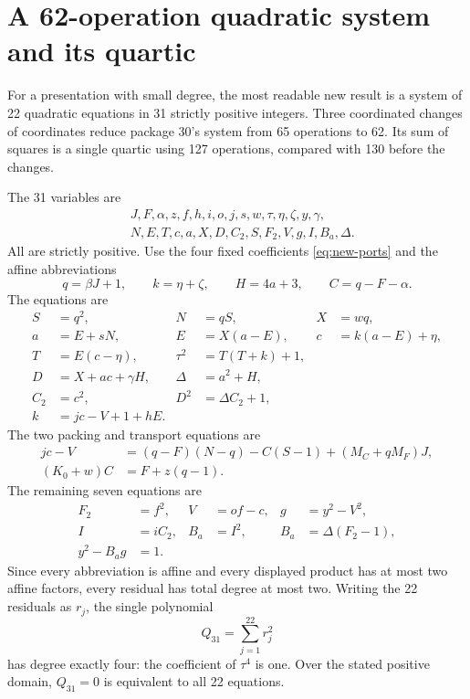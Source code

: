 \section{A 62-operation quadratic system and its quartic}
\label{sec:quartic}

For a presentation with small degree, the most readable new result is
a system of 22 quadratic equations in 31 strictly positive integers.
Three coordinated changes of coordinates reduce package 30's system
from 65 operations to 62. Its sum of squares is a single quartic using
127 operations, compared with 130 before the changes.

The 31 variables are
\begin{align*}
 &J,F,\alpha,z,f,h,i,o,j,s,w,\tau,\eta,\zeta,y,\gamma,\\
 &N,E,T,c,a,X,D,C_2,S,F_2,V,g,I,B_a,\Delta.
\end{align*}
All are strictly positive. Use the four fixed coefficients
\eqref{eq:new-ports} and the affine abbreviations
\[
 q=\beta J+1,\qquad k=\eta+\zeta,\qquad H=4a+3,
 \qquad C=q-F-\alpha.
\]
The equations are
\begin{align}
 S&=q^2, &N&=qS, &X&=wq,\label{eq:quad-start}\\
 a&=E+sN, &E&=X(a-E), &c&=k(a-E)+\eta,\\
 T&=E(c-\eta), &\tau^2&=T(T+k)+1,\\
 D&=X+ac+\gamma H, &\Delta&=a^2+H,\\
 C_2&=c^2, &D^2&=\Delta C_2+1,\\
 k&=jc-V+1+hE.&&
\end{align}
The two packing and transport equations are
\begin{align}
 jc-V&=(q-F)(N-q)-C(S-1)+(M_C+qM_F)J,\\
 (K_0+w)C&=F+z(q-1).
\end{align}
The remaining seven equations are
\begin{align}
 F_2&=f^2, &V&=of-c, &g&=y^2-V^2,\\
 I&=iC_2, &B_a&=I^2, &B_a&=\Delta(F_2-1),\\
 y^2-B_ag&=1.&&&\label{eq:quad-end}
\end{align}
Since every abbreviation is affine and every displayed product has
at most two affine factors, every residual has total degree at most two.
Writing the 22 residuals as $r_j$, the single polynomial
\begin{equation}\label{eq:new-quartic}
 Q_{31}=\sum_{j=1}^{22}r_j^2
\end{equation}
has degree exactly four: the coefficient of $\tau^4$ is one. Over the
stated positive domain, $Q_{31}=0$ is equivalent to all 22 equations.

